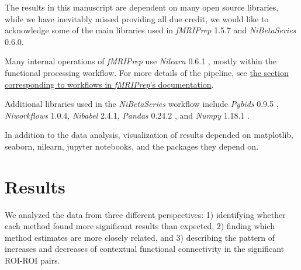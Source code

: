 \documentclass[phd,appendix,figures]{uithesis}
\begin{document}
The results in this manuscript are dependent on many open source
libraries, while we have inevitably missed providing all due credit,
we would like to acknowledge some of the main libraries used in 
\emph{fMRIPrep} 1.5.7\cite{fmriprep1} and \emph{NiBetaSeries} 0.6.0\cite{Kent2018}.

Many internal operations of \emph{fMRIPrep} use \emph{Nilearn} 0.6.1
\cite[RRID:SCR\_001362]{nilearn}, mostly within the functional
processing workflow. For more details of the pipeline, see
\href{https://fmriprep.readthedocs.io/en/latest/workflows.html}{the
section corresponding to workflows in \emph{fMRIPrep}'s documentation}.

Additional libraries used in the \emph{NiBetaSeries} workflow include
\emph{Pybids} 0.9.5 \cite{Yarkoni2019}, \emph{Niworkflows} 1.0.4,
\emph{Nibabel} 2.4.1, \emph{Pandas} 0.24.2 \cite{McKinney2010}, and
\emph{Numpy} 1.18.1 \cite{VanDerWalt2011, Oliphant2006}.

In addition to the data analysis, visualization of results depended
on matplotlib\cite{Hunter2007}, seaborn\cite{Waskom2020}, nilearn,
jupyter notebooks\cite{Kluyver2016a}, and the packages they depend on.

\section{Results}
We analyzed the data from three different perspectives:
1) identifying whether each method found more significant results than expected,
2) finding which method estimates are more closely related, and
3) describing the pattern of increases and decreases of contextual functional connectivity
   in the significant ROI-ROI pairs.
\end{document}
